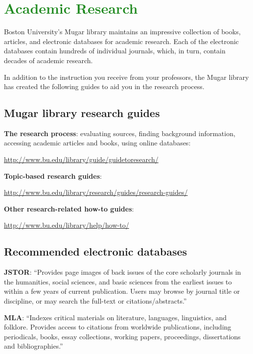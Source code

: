 
\section{\textcolor{ForestGreen}{Academic Research}}

Boston University's Mugar library maintains an impressive collection of books, articles, and electronic databases for academic research. Each of the electronic databases contain hundreds of individual journals, which, in turn, contain decades of academic research.

In addition to the instruction you receive from your professors, the Mugar library has created the following guides to aid you in the research process.

\subsection{Mugar library research guides}

\textbf{The research process}: evaluating sources, finding background information, accessing academic articles and books, using online databases: 

\url {http://www.bu.edu/library/guide/guidetoresearch/}

\textbf{Topic-based research guides}:

\url{http://www.bu.edu/library/research/guides/research-guides/}

\textbf{Other research-related how-to guides}:

\url{http://www.bu.edu/library/help/how-to/}

\subsection{Recommended electronic databases}


\textbf{JSTOR}: ``Provides page images of back issues of the core scholarly journals in the humanities, social sciences, and basic sciences from the earliest issues to within a few years of current publication. Users may browse by journal title or discipline, or may search the full-text or citations/abstracts.''

\textbf{MLA}: ``Indexes critical materials on literature, languages, linguistics, and folklore. Provides access to citations from worldwide publications, including periodicals, books, essay collections, working papers, proceedings, dissertations and bibliographies.''

